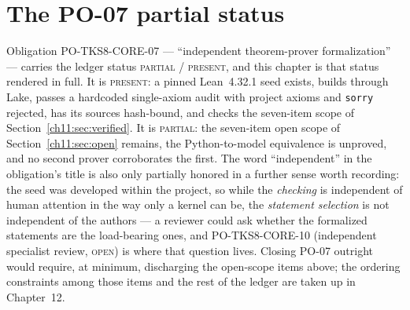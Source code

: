 \section{The PO-07 partial status}\label{ch11:sec:po07}

Obligation PO-TKS8-CORE-07 --- ``independent theorem-prover
formalization'' --- carries the ledger status \textsc{partial /
present}, and this chapter is that status rendered in full. It is
\textsc{present}: a pinned Lean~4.32.1 seed exists, builds through
Lake, passes a hardcoded single-axiom audit with project axioms and
\texttt{sorry} rejected, has its sources hash-bound, and checks the
seven-item scope of Section~\ref{ch11:sec:verified}. It is
\textsc{partial}: the seven-item open scope of
Section~\ref{ch11:sec:open} remains, the Python-to-model equivalence
is unproved, and no second prover corroborates the first. The word
``independent'' in the obligation's title is also only partially
honored in a further sense worth recording: the seed was developed
within the project, so while the \emph{checking} is independent of
human attention in the way only a kernel can be, the \emph{statement
selection} is not independent of the authors --- a reviewer could ask
whether the formalized statements are the load-bearing ones, and
PO-TKS8-CORE-10 (independent specialist review, \textsc{open}) is
where that question lives. Closing PO-07 outright would require, at
minimum, discharging the open-scope items above; the ordering
constraints among those items and the rest of the ledger are taken up
in Chapter~12.
